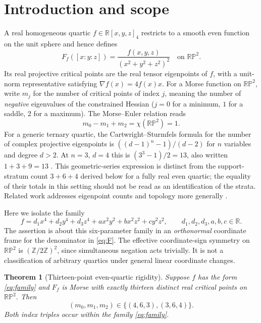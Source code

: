 \documentclass[10pt,a4paper]{article}
\theoremstyle{plain}
\newtheorem{theorem}{Theorem}
\theoremstyle{remark}
\newcommand{\RP}{\mathbb{RP}}
\begin{document}
\section{Introduction and scope}
A real homogeneous quartic $f\in\mathbb R[x,y,z]_4$ restricts to a smooth even function on the unit sphere and hence defines
\begin{equation}\label{eq:F}
 F_f([x:y:z])=\frac{f(x,y,z)}{(x^2+y^2+z^2)^2}\quad\text{on }\RP^2.
\end{equation}
Its real projective critical points are the real tensor eigenpoints of $f$, with a unit-norm representative satisfying $\nabla f(x)=4f(x)x$. For a Morse function on $\RP^2$, write $m_j$ for the number of critical points of index $j$, meaning the number of \emph{negative} eigenvalues of the constrained Hessian ($j=0$ for a minimum, $1$ for a saddle, $2$ for a maximum). The Morse--Euler relation reads
\begin{equation}\label{eq:euler}
 m_0-m_1+m_2=\chi(\RP^2)=1.
\end{equation}
For a generic ternary quartic, the Cartwright--Sturmfels formula for the number of complex projective eigenpoints is $((d-1)^n-1)/(d-2)$ for $n$ variables and degree $d>2$. At $n=3$, $d=4$ this is $(3^3-1)/2=13$, also written $1+3+9=13$ \cite{cartwright2013}. This geometric-series expression is distinct from the support-stratum count $3+6+4$ derived below for a fully real even quartic; the equality of their totals in this setting should not be read as an identification of the strata. Related work addresses eigenpoint counts and topology more generally \cite{abo2017,maccioni2018,bassotu2020,kozhasov2018}.

Here we isolate the family
\begin{equation}\label{eq:family}
 f=d_1x^4+d_2y^4+d_3z^4+ax^2y^2+bx^2z^2+cy^2z^2,
 \qquad d_1,d_2,d_3,a,b,c\in\mathbb R.
\end{equation}
The assertion is about this six-parameter family in an \emph{orthonormal} coordinate frame for the denominator in \eqref{eq:F}. The effective coordinate-sign symmetry on $\RP^2$ is $(\mathbb Z/2\mathbb Z)^2$, since simultaneous negation acts trivially. It is not a classification of arbitrary quartics under general linear coordinate changes.

\begin{theorem}[Thirteen-point even-quartic rigidity]\label{thm:main}
Suppose $f$ has the form \eqref{eq:family} and $F_f$ is Morse with exactly thirteen distinct real critical points on $\RP^2$. Then
\begin{equation}\label{eq:claim}
 (m_0,m_1,m_2)\in\{(4,6,3),(3,6,4)\}.
\end{equation}
Both index triples occur within the family \eqref{eq:family}.
\end{theorem}
\end{document}
